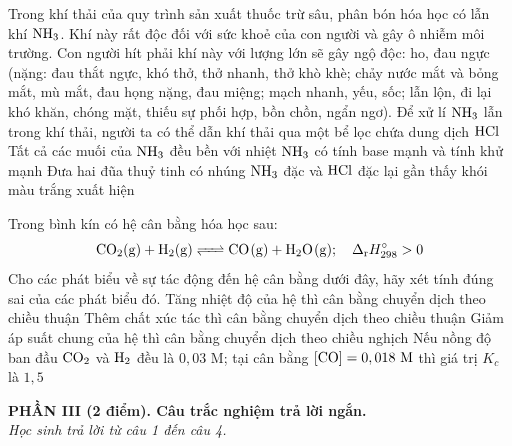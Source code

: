 \documentclass[11pt,a4paper]{article}
\begin{document}
\begin{ex}
Trong khí thải của quy trình sản xuất thuốc trừ sâu, phân bón hóa học có lẫn khí $\ce{NH3}$. Khí này rất độc đối với sức khoẻ của con người và gây ô nhiễm môi trường. Con người hít phải khí này với lượng lớn sẽ gây ngộ độc: ho, đau ngực (nặng: đau thắt ngực, khó thở, thở nhanh, thở khò khè; chảy nước mắt và bỏng mắt, mù mắt, đau họng nặng, đau miệng; mạch nhanh, yếu, sốc; lẫn lộn, đi lại khó khăn, chóng mặt, thiếu sự phối hợp, bồn chồn, ngẩn ngơ).
\choiceTF
{\True Để xử lí $\ce{NH3}$ lẫn trong khí thải, người ta có thể dẫn khí thải qua một bể lọc chứa dung dịch $\ce{HCl}$}
{Tất cả các muối của $\ce{NH3}$ đều bền với nhiệt}
{$\ce{NH3}$ có tính base mạnh và tính khử mạnh}
{\True Đưa hai đũa thuỷ tinh có nhúng $\ce{NH3}$ đặc và $\ce{HCl}$ đặc lại gần thấy khói màu trắng xuất hiện}
\end{ex}
\begin{ex}
Trong bình kín có hệ cân bằng hóa học sau:
$$\ce{CO2(g) + H2(g) <=> CO(g) + H2O(g)};\quad \Delta_{\mathrm{r}}H^{\circ}_{298} > 0$$
Cho các phát biểu về sự tác động đến hệ cân bằng dưới đây, hãy xét tính đúng sai của các phát biểu đó.
\choiceTF
{\True Tăng nhiệt độ của hệ thì cân bằng chuyển dịch theo chiều thuận}
{Thêm chất xúc tác thì cân bằng chuyển dịch theo chiều thuận}
{Giảm áp suất chung của hệ thì cân bằng chuyển dịch theo chiều nghịch}
{Nếu nồng độ ban đầu $\ce{CO2}$ và $\ce{H2}$ đều là $0,03\text{ M}$; tại cân bằng $[\ce{CO}] = 0,018\text{ M}$ thì giá trị $K_c$ là $1,5$}
\end{ex}
\vspace{4pt}
\noindent
{\color{mainGreen}\textbf{\Large PHẦN III (2 điểm). Câu trắc nghiệm trả lời ngắn.}}\\
\textit{\small Học sinh trả lời từ câu 1 đến câu 4.}
\vspace{2pt}
\end{document}
